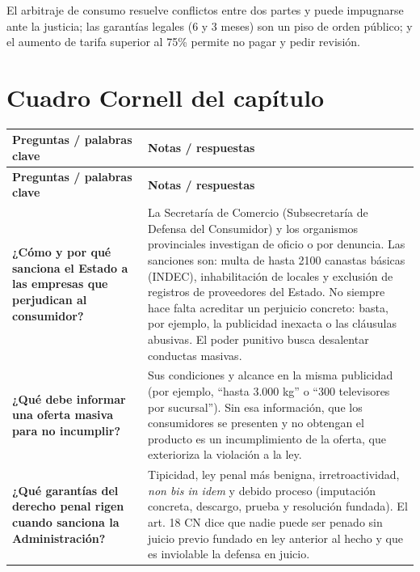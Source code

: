 \documentclass[12pt,oneside]{book}
\begin{document}
\begin{important}
El arbitraje de consumo resuelve conflictos entre dos partes y puede impugnarse ante la justicia; las garantías legales (6 y 3 meses) son un piso de orden público; y el aumento de tarifa superior al 75\% permite no pagar y pedir revisión.
\end{important}

\section{Cuadro Cornell del capítulo}

\begin{longtable}{
    >{\raggedright\arraybackslash}p{}
    !{\vrule width 0.4pt}
    >{\raggedright\arraybackslash}p{\tabcolsep-0.4pt\relax}
}
\toprule
\textbf{Preguntas / palabras clave} & \textbf{Notas / respuestas} \\
\midrule
\endfirsthead
\toprule
\textbf{Preguntas / palabras clave} & \textbf{Notas / respuestas} \\
\midrule
\endhead
\bottomrule
\endfoot
\bottomrule
\endlastfoot

\textbf{¿Cómo y por qué sanciona el Estado a las empresas que perjudican al consumidor?} &
La Secretaría de Comercio (Subsecretaría de Defensa del Consumidor) y los organismos provinciales investigan de oficio o por denuncia. Las sanciones son: multa de hasta 2100 canastas básicas (INDEC), inhabilitación de locales y exclusión de registros de proveedores del Estado. No siempre hace falta acreditar un perjuicio concreto: basta, por ejemplo, la publicidad inexacta o las cláusulas abusivas. El poder punitivo busca desalentar conductas masivas. \\[0.6em]

\textbf{¿Qué debe informar una oferta masiva para no incumplir?} &
Sus condiciones y alcance en la misma publicidad (por ejemplo, ``hasta 3.000 kg'' o ``300 televisores por sucursal''). Sin esa información, que los consumidores se presenten y no obtengan el producto es un incumplimiento de la oferta, que exterioriza la violación a la ley. \\[0.6em]

\textbf{¿Qué garantías del derecho penal rigen cuando sanciona la Administración?} &
Tipicidad, ley penal más benigna, irretroactividad, \textit{non bis in idem} y debido proceso (imputación concreta, descargo, prueba y resolución fundada). El art. 18 CN dice que nadie puede ser penado sin juicio previo fundado en ley anterior al hecho y que es inviolable la defensa en juicio. \\[0.6em]


\end{longtable}
\end{document}
